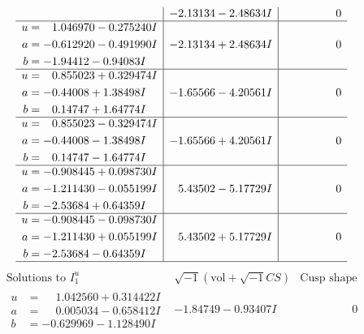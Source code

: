 \documentclass[1p]{elsarticle_modified}
\theoremstyle{definition}
\newcommand{\I}{\sqrt{-1}}
\begin{document}
$$\begin{array}{c|c|c}
 & -2.13134 - 2.48634 I & \phantom{-0.000000 } 0 \\ \hline\begin{aligned}
u &= \phantom{-}1.046970 - 0.275240 I \\
a &= -0.612920 - 0.491990 I \\
b &= -1.94412 - 0.94083 I\end{aligned}
 & -2.13134 + 2.48634 I & \phantom{-0.000000 } 0 \\ \hline\begin{aligned}
u &= \phantom{-}0.855023 + 0.329474 I \\
a &= -0.44008 + 1.38498 I \\
b &= \phantom{-}0.14747 + 1.64774 I\end{aligned}
 & -1.65566 - 4.20561 I & \phantom{-0.000000 } 0 \\ \hline\begin{aligned}
u &= \phantom{-}0.855023 - 0.329474 I \\
a &= -0.44008 - 1.38498 I \\
b &= \phantom{-}0.14747 - 1.64774 I\end{aligned}
 & -1.65566 + 4.20561 I & \phantom{-0.000000 } 0 \\ \hline\begin{aligned}
u &= -0.908445 + 0.098730 I \\
a &= -1.211430 - 0.055199 I \\
b &= -2.53684 + 0.64359 I\end{aligned}
 & \phantom{-}5.43502 - 5.17729 I & \phantom{-0.000000 } 0 \\ \hline\begin{aligned}
u &= -0.908445 - 0.098730 I \\
a &= -1.211430 + 0.055199 I \\
b &= -2.53684 - 0.64359 I\end{aligned}
 & \phantom{-}5.43502 + 5.17729 I & \phantom{-0.000000 } 0\\
 \hline 
 \end{array}$$\newpage$$\begin{array}{c|c|c}  
\text{Solutions to }I^u_{1}& \I (\text{vol} + \sqrt{-1}CS) & \text{Cusp shape}\\
 \hline 
\begin{aligned}
u &= \phantom{-}1.042560 + 0.314422 I \\
a &= \phantom{-}0.005034 - 0.658412 I \\
b &= -0.629969 - 1.128490 I\end{aligned}
 & -1.84749 - 0.93407 I & \phantom{-0.000000 } 0 \\ \hline\begin{aligned}

\end{aligned}
\end{array}$$
\end{document}
